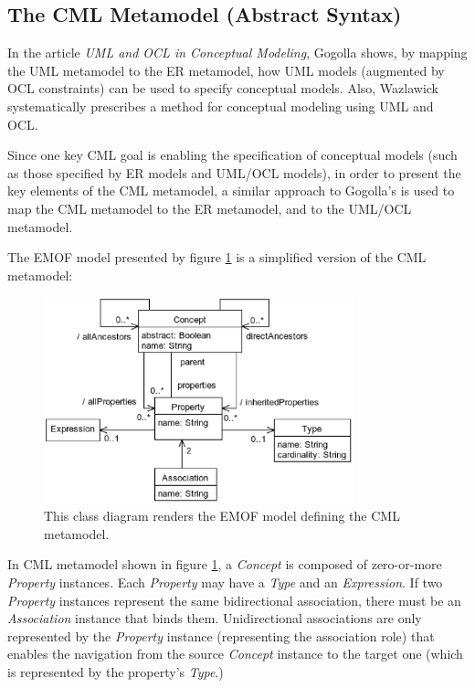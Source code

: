 \subsection{The CML Metamodel (Abstract Syntax)}\label{subsec:metamodel}

In the article \emph{UML and OCL in Conceptual Modeling}, 
Gogolla \cite{gogolla} shows, by mapping the UML \cite{uml} metamodel to the ER \cite{er} metamodel,
how UML models (augmented by OCL \cite{ocl} constraints) can be used to specify conceptual models.
Also, Wazlawick \cite{wazlawick} systematically prescribes a method for conceptual modeling using UML and OCL. 

Since one key CML goal is enabling the specification of conceptual models
(such as those specified by ER models and UML/OCL models),
in order to present the key elements of the CML metamodel,
a similar approach to Gogolla's is used to map the CML metamodel to the ER metamodel,
and to the UML/OCL metamodel.

The EMOF \cite{mof} model presented by figure \ref{fig:metamodel} is a simplified version of the CML metamodel:

\begin{figure}
\centering
\includegraphics[width=0.8\textwidth]{language/diagram-metamodel}
\caption{This class diagram renders the EMOF \cite{mof} model defining the CML metamodel.}
\label{fig:metamodel}
\end{figure}

In CML metamodel shown in figure \ref{fig:metamodel},
a \emph{Concept} is composed of zero-or-more \emph{Property} instances.
Each \emph{Property} may have a \emph{Type} and an \emph{Expression}.
If two \emph{Property} instances represent the same bidirectional association,
there must be an \emph{Association} instance that binds them.
Unidirectional associations are only represented by the \emph{Property} instance (representing the association role)
that enables the navigation from the source \emph{Concept} instance to the target one (which is represented by the property's \emph{Type}.)

